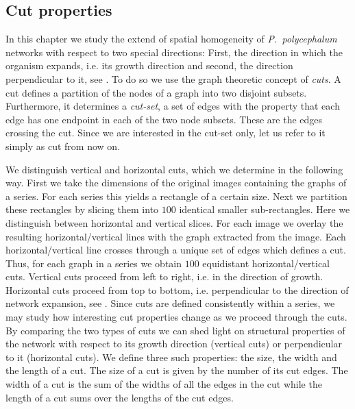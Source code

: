 	\subsection{Cut properties}

		In this chapter we study the extend of spatial homogeneity of \emph{P.~polycephalum} networks with respect to two special directions: First, the direction in which the organism expands, i.e. its growth direction and second, the direction perpendicular to it, see . To do so we use the graph theoretic concept of \emph{cuts}. A cut defines a partition of the nodes of a graph into two disjoint subsets. Furthermore, it determines a \emph{cut-set}, a set of edges with the property that each edge has one endpoint in each of the two node subsets. These are the edges crossing the cut. Since we are interested in the cut-set only, let us refer to it simply as cut from now on. 

		We distinguish vertical and horizontal cuts, which we determine in the following way. First we take the dimensions of the original images containing the graphs of a series. For each series this yields a rectangle of a certain size. Next we partition these rectangles by slicing them into $100$ identical smaller sub-rectangles. Here we distinguish between horizontal and vertical slices. For each image we overlay the resulting horizontal/vertical lines with the graph extracted from the image. Each horizontal/vertical line crosses through a unique set of edges which defines a cut. Thus, for each graph in a series we obtain $100$ equidistant horizontal/vertical cuts. Vertical cuts proceed from left to right, i.e. in the direction of growth. Horizontal cuts proceed from top to bottom, i.e. perpendicular to the direction of network expansion, see . Since cuts are defined consistently within a series, we may study how interesting cut properties change as we proceed through the cuts. By comparing the two types of cuts we can shed light on structural properties of the network with respect to its growth direction (vertical cuts) or perpendicular to it (horizontal cuts). We define three such properties: the size, the width and the length of a cut. The size of a cut is given by the number of its cut edges. The width of a cut is the sum of the widths of all the edges in the cut while the length of a cut sums over the lengths of the cut edges. 

